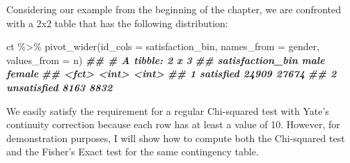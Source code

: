 \documentclass[
]{book}
\newenvironment{Shaded}{\begin{snugshade}}{\end{snugshade}}
\newcommand{\AttributeTok}[1]{\textcolor[rgb]{0.77,0.63,0.00}{#1}}
\newcommand{\DocumentationTok}[1]{\textcolor[rgb]{0.56,0.35,0.01}{\textbf{\textit{#1}}}}
\newcommand{\FunctionTok}[1]{\textcolor[rgb]{0.00,0.00,0.00}{#1}}
\newcommand{\NormalTok}[1]{#1}
\newcommand{\SpecialCharTok}[1]{\textcolor[rgb]{0.00,0.00,0.00}{#1}}
\begin{document}
Considering our example from the beginning of the chapter, we are confronted with a 2x2 table that has the following distribution:

\begin{Shaded}
\begin{Highlighting}[]
\NormalTok{ct }\SpecialCharTok{\%\textgreater{}\%} \FunctionTok{pivot\_wider}\NormalTok{(}\AttributeTok{id\_cols =}\NormalTok{ satisfaction\_bin,}
                   \AttributeTok{names\_from =}\NormalTok{ gender,}
                   \AttributeTok{values\_from =}\NormalTok{ n)}
\DocumentationTok{\#\# \# A tibble: 2 x 3}
\DocumentationTok{\#\#   satisfaction\_bin  male female}
\DocumentationTok{\#\#   \textless{}fct\textgreater{}            \textless{}int\textgreater{}  \textless{}int\textgreater{}}
\DocumentationTok{\#\# 1 satisfied        24909  27674}
\DocumentationTok{\#\# 2 unsatisfied       8163   8832}
\end{Highlighting}
\end{Shaded}

We easily satisfy the requirement for a regular Chi-squared test with Yate's continuity correction because each row has at least a value of 10. However, for demonstration purposes, I will show how to compute both the Chi-squared test and the Fisher's Exact test for the same contingency table.
\end{document}
